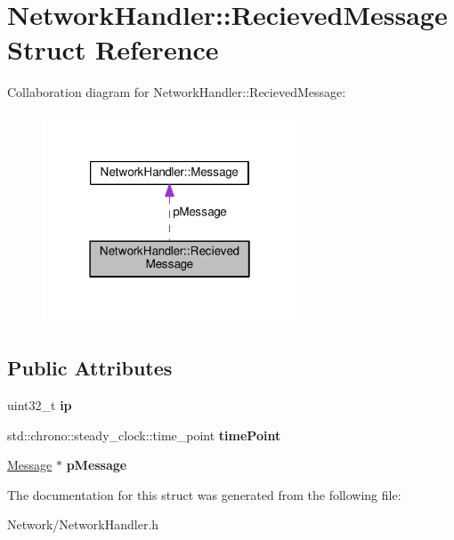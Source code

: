 \hypertarget{structNetworkHandler_1_1RecievedMessage}{}\section{Network\+Handler\+:\+:Recieved\+Message Struct Reference}
\label{structNetworkHandler_1_1RecievedMessage}


Collaboration diagram for Network\+Handler\+:\+:Recieved\+Message\+:\nopagebreak
\begin{figure}[H]
\begin{center}
\leavevmode
\includegraphics[width=214pt]{structNetworkHandler_1_1RecievedMessage__coll__graph}
\end{center}
\end{figure}
\subsection*{Public Attributes}
\begin{DoxyCompactItemize}
\item 
uint32\+\_\+t {\bfseries ip}\hypertarget{structNetworkHandler_1_1RecievedMessage_a6f01f4a042b9f5a4cd40d441e0e29d48}{}\label{structNetworkHandler_1_1RecievedMessage_a6f01f4a042b9f5a4cd40d441e0e29d48}

\item 
std\+::chrono\+::steady\+\_\+clock\+::time\+\_\+point {\bfseries time\+Point}\hypertarget{structNetworkHandler_1_1RecievedMessage_a0ce3474866ebd9fefaeba2cf901959e2}{}\label{structNetworkHandler_1_1RecievedMessage_a0ce3474866ebd9fefaeba2cf901959e2}

\item 
\hyperlink{structNetworkHandler_1_1Message}{Message} $\ast$ {\bfseries p\+Message}\hypertarget{structNetworkHandler_1_1RecievedMessage_a3407eb8d41737f5ab7fbf73fa6813342}{}\label{structNetworkHandler_1_1RecievedMessage_a3407eb8d41737f5ab7fbf73fa6813342}

\end{DoxyCompactItemize}


The documentation for this struct was generated from the following file\+:\begin{DoxyCompactItemize}
\item 
Network/Network\+Handler.\+h\end{DoxyCompactItemize}
